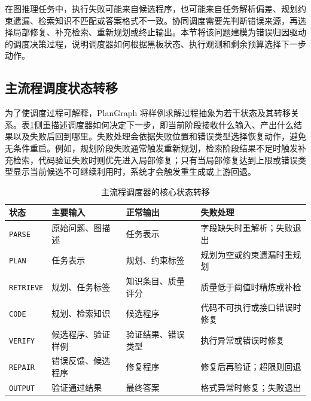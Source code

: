 在图推理任务中，执行失败可能来自候选程序，也可能来自任务解析偏差、规划约束遗漏、检索知识不匹配或答案格式不一致。协同调度需要先判断错误来源，再选择局部修复、补充检索、重新规划或终止输出。本节将该问题建模为错误归因驱动的调度决策过程，说明调度器如何根据黑板状态、执行观测和剩余预算选择下一步动作。

\subsection{主流程调度状态转移}

为了使调度过程可解释，PlanGraph 将样例求解过程抽象为若干状态及其转移关系。表\ref{tab:scheduler_states}侧重描述调度器如何决定下一步，即当前阶段接收什么输入、产出什么结果以及失败后回到哪里。失败处理会依据失败位置和错误类型选择恢复动作，避免无条件重启。例如，规划阶段失败通常触发重新规划，检索阶段结果不足时触发补充检索，代码验证失败时则优先进入局部修复；只有当局部修复达到上限或错误类型显示当前候选不可继续利用时，系统才会触发重生成或上游回退。

\begin{table}[htbp]
\centering
\small
\caption{主流程调度器的核心状态转移}
\label{tab:scheduler_states}
\renewcommand{\arraystretch}{1.15}
\begin{tabularx}{\textwidth}{
>{\raggedright\arraybackslash}p{1.7cm}
>{\raggedright\arraybackslash}p{3.45cm}
>{\raggedright\arraybackslash}p{3.45cm}
>{\raggedright\arraybackslash}X}
\toprule
状态 & 主要输入 & 正常输出 & 失败处理 \\
\midrule
\texttt{PARSE} & 原始问题、图描述 & 任务表示 & 字段缺失时重解析；失败退出 \\
\texttt{PLAN} & 任务表示 & 规划、约束标签 & 规划为空或约束遗漏时重规划 \\
\texttt{RETRIEVE} & 规划、任务标签 & 知识条目、质量评分 & 质量低于阈值时精炼或补检 \\
\texttt{CODE} & 规划、检索知识 & 候选程序 & 代码不可执行或接口错误时修复 \\
\texttt{VERIFY} & 候选程序、验证样例 & 验证结果、错误类型 & 执行异常或错误时修复 \\
\texttt{REPAIR} & 错误反馈、候选程序 & 修复程序 & 修复后再验证；超限则回退 \\
\texttt{OUTPUT} & 验证通过结果 & 最终答案 & 格式异常时修复；失败退出 \\
\bottomrule
\end{tabularx}
\end{table}

